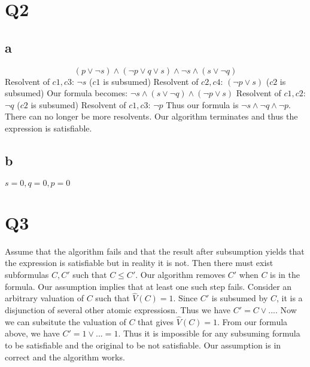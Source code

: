 \documentclass[12pt]{article}
\begin{document}
\section{Q2}
\subsection{a}
\[
    (p \lor \neg s) \land (\neg p \lor q \lor s) \land \neg s \land (s \lor \neg q)
    \]
Resolvent of $c1, c3$: $\neg s$ ($c1$ is subsumed)
\newline
Resolvent of $c2, c4$: $(\neg p \lor s)$ ($c2$ is subsumed)
\newline
Our formula becomes: $\neg s \land (s \lor \neg q) \land (\neg p \lor s)$
\newline
Resolvent of $c1, c2$: $\neg q$ ($c2$ is subsumed)
\newline
Resolvent of $c1, c3$: $\neg p$
\newline
Thus our formula is $\neg s \land \neg q \land \neg p$. There can no longer be more 
resolvents. Our algorithm terminates and thus the expression is satisfiable.

\subsection{b}
$s = 0, q = 0, p = 0$


\section{Q3}
Assume that the algorithm fails and that the result after subsumption yields that the expression 
is satisfiable but in reality it is not.
\newline
Then there must exist subformulas $C, C'$ such that $C \leq C'$. Our algorithm removes $C'$ when 
$C$ is in the formula. Our assumption implies that at least one such step fails.
\newline
Consider an arbitrary valuation of $C$ such that $\hat{V}(C) = 1$. Since $C'$ is 
subsumed by $C$, it is a disjunction of several other atomic expressiosn. Thus we have 
$C' = C \lor ...$. Now we can subsitute the valuation of $C$ that gives $\hat{V}(C) = 1$. 
From our formula above, we have $C' = 1 \lor ... = 1$.
\newline
Thus it is impossible for any subsuming formula to be satisfiable and the original to be not 
satisfiable. Our assumption is in correct and the algorithm works.
\end{document}
